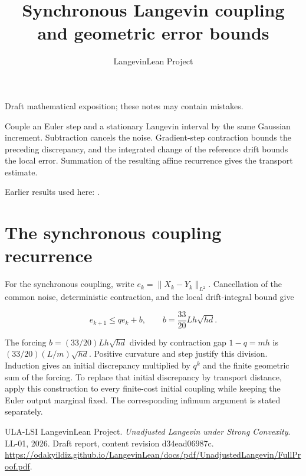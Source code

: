 \documentclass[11pt,a4paper]{article}
\title{\texorpdfstring{Synchronous Langevin coupling and geometric error bounds}{Synchronous Langevin coupling and geometric error bounds}}
\author{LangevinLean Project}
\date{}
\begin{document}
\maketitle
Draft mathematical exposition; these notes may contain mistakes.


Couple an Euler step and a stationary Langevin interval by the same Gaussian increment. Subtraction cancels the noise. Gradient-step contraction bounds the preceding discrepancy, and the integrated change of the reference drift bounds the local error. Summation of the resulting affine recurrence gives the transport estimate.




Earlier results used here: \cite[Section~3.19]{LangevinLean2026ULASC}.

\section{\texorpdfstring{The synchronous coupling recurrence}{The synchronous coupling recurrence}}


For the synchronous coupling, write \(e_k=\|X_k-Y_k\|_{L^2}\). Cancellation of the common noise, deterministic contraction, and the local drift-integral bound give

\[e_{k+1}\le q e_k+b,\qquad b=\frac{33}{20}Lh\sqrt{hd}.\]

The forcing \(b=(33/20)Lh\sqrt{hd}\) divided by contraction gap \(1-q=mh\) is \((33/20)(L/m)\sqrt{hd}\). Positive curvature and step justify this division. Induction gives an initial discrepancy multiplied by \(q^k\) and the finite geometric sum of the forcing. To replace that initial discrepancy by transport distance, apply this construction to every finite-cost initial coupling while keeping the Euler output marginal fixed. The corresponding infimum argument is stated separately.




\begin{thebibliography}{ULA-LSI}
LangevinLean Project. \emph{Unadjusted Langevin under Strong Convexity}. LL-01, 2026. Draft report, content revision d34ead06987c. \url{https://odakyildiz.github.io/LangevinLean/docs/pdf/UnadjustedLangevin/FullProof.pdf}.
\end{thebibliography}
\end{document}
